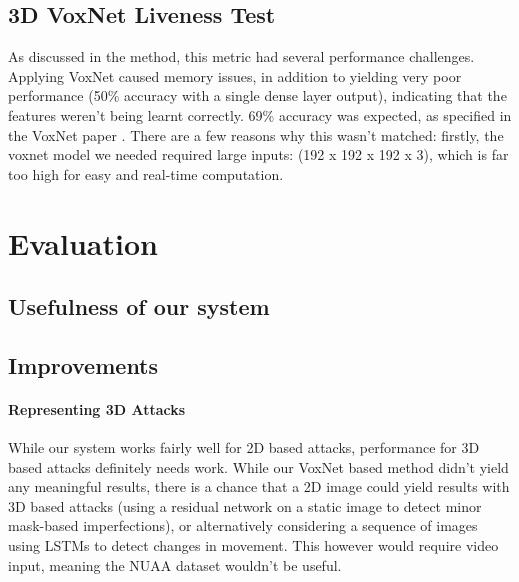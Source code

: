 \documentclass[10pt,a4paper]{article}
\begin{document}
    \subsection{3D VoxNet Liveness Test}
            As discussed in the method, this metric had several performance challenges. Applying VoxNet caused memory issues, in addition to yielding very poor performance
            (50\% accuracy with a single dense layer output), indicating that the features weren't being learnt correctly. 69\% accuracy was expected, as specified in the
            VoxNet paper \cite{VoxNetModel}. There are a few reasons why this wasn't matched: firstly, the voxnet model we needed required large inputs: (192 x 192 x 192 x 3),
            which is far too high for easy and real-time computation. 

\section{Evaluation}
    \subsection{Usefulness of our system}
    

    \subsection{Improvements}
        \paragraph{Representing 3D Attacks}
        While our system works fairly well for 2D based attacks, performance for 3D based attacks definitely needs work.
        While our VoxNet based method didn't yield any meaningful results, there is a chance that a 2D image could yield results
        with 3D based attacks (using a residual network on a static image to detect minor mask-based imperfections), or alternatively
        considering a sequence of images using LSTMs to detect changes in movement. This however would require video input, meaning the
        NUAA dataset wouldn't be useful.
\end{document}
